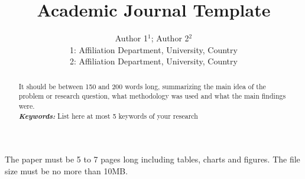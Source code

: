 \documentclass[10pt,letterpaper]{article}
\title{\textbf{Academic Journal Template}}
\author{Author 1$^{1}$; Author 2$^{2}$\\
        1: Affiliation Department, University, Country\\
        2: Affiliation Department, University, Country}
\date{}
\providecommand{\keywords}[1]
        {
          \small	
          \textbf{\textit{Keywords:}} #1
        }
\begin{document}
\maketitle
    \begin{abstract}
        It should be between 150 and 200 words long, summarizing the main idea of the problem or research question, what methodology was used and what the main findings were.\\
        \keywords{List here at most 5 keywords of your research} 
    \end{abstract}
    
    \tableofcontents
    
    
    
    
    
    
    
    

    
    \appendix
    

    The paper must be 5 to 7 pages long including tables, charts and figures. The file size must be no more than 10MB.
\end{document}
